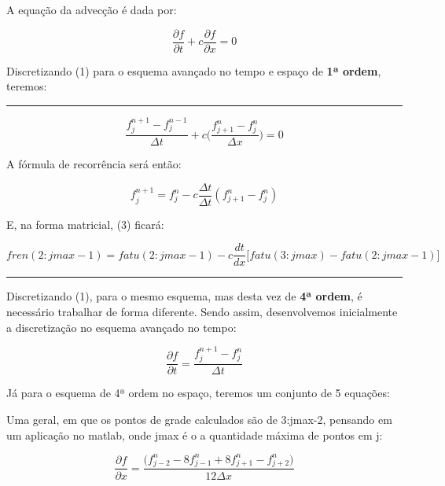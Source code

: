 \documentclass[11pt]{article}
\begin{document}
A equação da advecção é dada por:

\begin{equation}
    \frac{\partial{f}}{\partial{t}} + c\frac{\partial{f}}{\partial{x}} = 0
\end{equation}

Discretizando (1) para o esquema avançado no tempo e espaço de
\textbf{1ª ordem}, teremos:

\begin{center}\rule{0.5\linewidth}{\linethickness}\end{center}

\begin{equation}
    \frac{f^{n+1}_{j} - f^{n-1}_{j}}{\Delta{t}} + c\Biggl( \frac{f^{n}_{j+1} - f^{n}_{j}}{\Delta{x}} \Biggl) = 0
\end{equation}

A fórmula de recorrência será então:

\begin{equation}
    f^{n+1}_{j} = f^{n}_{j} - c\frac{\Delta{t}}{\Delta{t}}(f^{n}_{j+1} - f^{n}_{j})
\end{equation}

E, na forma matricial, (3) ficará:

\begin{equation}
fren(2:jmax-1) = fatu(2:jmax-1) - c\frac{dt}{dx}\biggr[ fatu(3:jmax) - fatu(2:jmax-1) \biggr]
\end{equation}

\begin{center}\rule{0.5\linewidth}{\linethickness}\end{center}

Discretizando (1), para o mesmo esquema, mas desta vez de \textbf{4ª
ordem}, é necessário trabalhar de forma diferente. Sendo assim,
desenvolvemos inicialmente a discretização no esquema avançado no tempo:

\begin{equation}
    \frac{\partial{f}}{\partial{t}} = \frac{f^{n+1}_{j} - f^{n}_{j}}{\Delta{t}}
\end{equation}

Já para o esquema de 4ª ordem no espaço, teremos um conjunto de 5
equações:

Uma geral, em que os pontos de grade calculados são de 3:jmax-2,
pensando em um aplicação no matlab, onde jmax é o a quantidade máxima de
pontos em j:

\begin{equation}
    \frac{\partial{f}}{\partial{x}} = \frac{\biggl( f^{n}_{j-2} - 8f^{n}_{j-1} + 8f^{n}_{j+1} - f^{n}_{j+2} \bigg)}{12\Delta{x}}
\end{equation}
\end{document}
